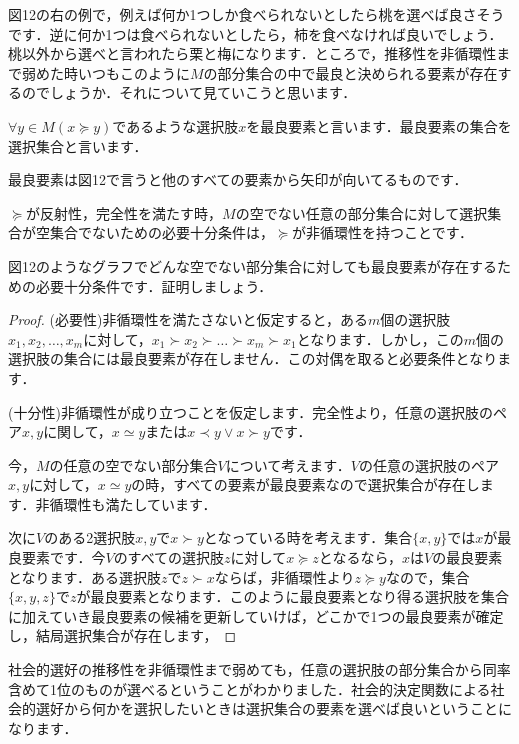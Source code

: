 図12の右の例で，例えば何か1つしか食べられないとしたら桃を選べば良さそうです．逆に何か1つは食べられないとしたら，柿を食べなければ良いでしょう．桃以外から選べと言われたら栗と梅になります．ところで，推移性を非循環性まで弱めた時いつもこのように$M$の部分集合の中で最良と決められる要素が存在するのでしょうか．それについて見ていこうと思います．

\begin{dfn}[選択集合]
    $\forall y \in M (x \succeq y)$であるような選択肢$x$を最良要素と言います．最良要素の集合を選択集合と言います．
\end{dfn}

最良要素は図12で言うと他のすべての要素から矢印が向いてるものです．

\begin{thm}
    $\succeq$が反射性，完全性を満たす時，$M$の空でない任意の部分集合に対して選択集合が空集合でないための必要十分条件は，$\succeq$が非循環性を持つことです．
\end{thm}

図12のようなグラフでどんな空でない部分集合に対しても最良要素が存在するための必要十分条件です．証明しましょう．

\begin{proof}
(必要性)非循環性を満たさないと仮定すると，ある$m$個の選択肢$x_1,x_2,\dots,x_m$に対して，$x_1 \succ x_2 \succ \dots \succ x_m \succ x_1$となります．しかし，この$m$個の選択肢の集合には最良要素が存在しません．この対偶を取ると必要条件となります．

(十分性)非循環性が成り立つことを仮定します．完全性より，任意の選択肢のペア$x,y$に関して，$x\simeq y$または$x \prec y \lor x \succ y$です．

今，$M$の任意の空でない部分集合$V$について考えます．$V$の任意の選択肢のペア$x,y$に対して，$x \simeq y$の時，すべての要素が最良要素なので選択集合が存在します．非循環性も満たしています．

次に$V$のある2選択肢$x,y$で$x \succ y$となっている時を考えます．集合$\{x,y\}$では$x$が最良要素です．今$V$のすべての選択肢$z$に対して$x \succeq z$となるなら，$x$は$V$の最良要素となります．ある選択肢$z$で$z \succ x$ならば，非循環性より$z \succeq y$なので，集合$\{x,y,z\}$で$z$が最良要素となります．このように最良要素となり得る選択肢を集合に加えていき最良要素の候補を更新していけば，どこかで1つの最良要素が確定し，結局選択集合が存在します，
\end{proof}

社会的選好の推移性を非循環性まで弱めても，任意の選択肢の部分集合から同率含めて1位のものが選べるということがわかりました．社会的決定関数による社会的選好から何かを選択したいときは選択集合の要素を選べば良いということになります．

